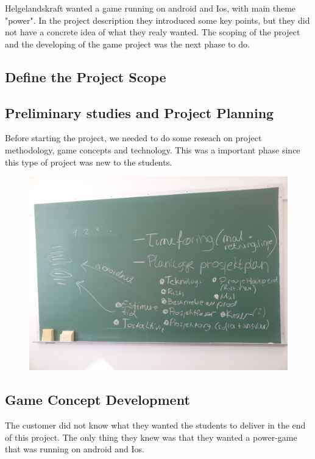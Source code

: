 	Helgelandskraft wanted a game running on android and Ios, with main theme "power".
	In the project description they introduced some key points, but they did not have a
	concrete idea of what they realy wanted. The scoping of the project and the developing
	of the game project was the next phase to do.

\subsection{Define the Project Scope}


\subsection{Preliminary studies and Project Planning}
	Before starting the project, we needed to do some reseach on project methodology, 
	game concepts and technology. This was a important phase since this type of 
	project was new to the students. 

	\begin{figure}[H]
		\includegraphics[scale=0.10]{pictures/projectPlanning.jpg}
	\end{figure}

\subsection{Game Concept Development}
	The customer did not know what they wanted the students to deliver in the end of 
	this project. The only thing they knew was that they wanted a power-game that
	was running on android and Ios. 

